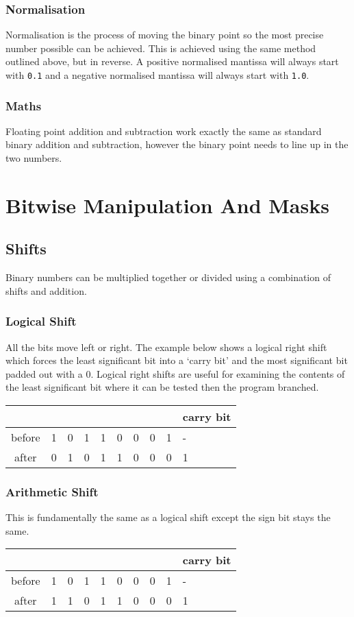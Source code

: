 \documentclass[a4paper,11pt, twocolumn]{article}
\begin{document}
\subsubsection{Normalisation}
Normalisation is the process of moving the binary point so the most precise number possible can be achieved. This is achieved using the same method outlined above, but in reverse. A positive normalised mantissa will always start with \verb|0.1| and a negative normalised mantissa will always start with \verb|1.0|. 
\subsubsection{Maths}
Floating point addition and subtraction work exactly the same as standard binary addition and subtraction, however the binary point needs to line up in the two numbers.

\section{Bitwise Manipulation And Masks}
\subsection{Shifts}
Binary numbers can be multiplied together or divided using a combination of shifts and addition. 
\subsubsection{Logical Shift}
All the bits move left or right. The example below shows a logical right shift which forces the least significant bit into a `carry bit' and the most significant bit padded out with a 0. Logical right shifts are useful for examining the contents of the least significant bit where it can be tested then the program branched.
\begin{table}[H]
    \centering
    \begin{tabularx}{0.9\linewidth}{c | c c c c c c c c | | X}
         &  &  &  &  &  &  &  &  & carry bit\\
         \hline
        before & 1 & 0 & 1 & 1 & 0 & 0 & 0 & 1 & - \\
        after & 0 & 1 & 0 & 1 & 1 & 0 & 0 & 0 & 1 
    \end{tabularx}
\end{table}
\subsubsection{Arithmetic Shift}
This is fundamentally the same as a logical shift except the sign bit stays the same.
\begin{table}[H]
    \centering
    \begin{tabularx}{0.9\linewidth}{c | c c c c c c c c | | X}
         &  &  &  &  &  &  &  &  & carry bit\\
         \hline
        before & 1 & 0 & 1 & 1 & 0 & 0 & 0 & 1 & - \\
        after & 1 & 1 & 0 & 1 & 1 & 0 & 0 & 0 & 1 
    \end{tabularx}
\end{table}
\end{document}
